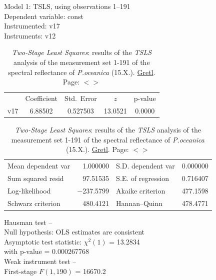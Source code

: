 \documentclass[11pt]{article}
\begin{document}
\begin{appendices}
\begin{table}[htbp]
	\caption{\textit{Two-Stage Least Squares}: results of the \textit{TSLS} analysis of the measurement set 1-191 of the spectral reflectance of \textit{P.oceanica} (15.X.). \href{http://gretl.sourceforge.net/}{Gretl}. Page: $<$\pageref{page-41}$>$}
	\begin{center}
		Model 1: TSLS, using observations 1--191\\
		Dependent variable: const\\
		Instrumented: v17 \\
		Instruments: v12 \\

	\vspace{1em}

	\begin{tabular}{|c c c c c|}
		  &  {Coefficient} &  {Std.\ Error} &  {$z$} &    {p-value} \\[1ex]
		v17 &  6.88502 & 0.527503 & 13.0521 & 0.0000 \\
	\end{tabular}

	\vspace{1ex}
	\begin{tabular}{lrlr}
		Mean dependent var &  1.000000 & S.D. dependent var &  0.000000 \\
		Sum squared resid &  97.51535 & S.E. of regression &  0.716407 \\
		Log-likelihood & $-$237.5799 & Akaike criterion &  477.1598 \\
		Schwarz criterion &  480.4121 & Hannan--Quinn &  478.4771 \\
	\end{tabular}

	\vspace{1em}
	\begin{raggedright}
		Hausman test --\\
		\quad Null hypothesis: OLS estimates are consistent\\
		\quad Asymptotic test statistic: $\chi^2(1)$ = 13.2834\\
		\quad with p-value = 0.000267768\\
	\vspace{1ex}
		Weak instrument test -- \\
		\quad First-stage $F(1, 190)$ = 16670.2 \\
	\end{raggedright}

	\end{center}
	\label{tab:18}
\end{table}


\end{appendices}
\end{document}
